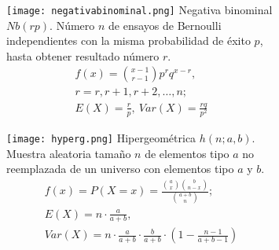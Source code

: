 \begin{figure}[H]
\begin{subfigure}[t]{.475\textwidth}\texttt{[image: negativabinominal.png]}
Negativa binominal $Nb(rp)$. Número $n$ de ensayos de Bernoulli independientes con la misma probabilidad de éxito $p$, hasta obtener resultado número $r$.
\begin{equation}\begin{matrix}
f(x)=\binom{x-1}{r-1}p^rq^{x-r},\\
r=r,r+1,r+2,\ldots,n;\\
E(X)=\frac{r}{p},\ Var(X)=\frac{rq}{p^2}
\end{matrix}\end{equation}\end{subfigure}\qquad
\begin{subfigure}[t]{.475\textwidth}\texttt{[image: hyperg.png]}
Hipergeométrica $h(n;a,b)$. Muestra aleatoria tamaño $n$ de elementos tipo $a$ no reemplazada de un universo con elementos tipo $a$ y $b$.
\begin{equation}\begin{matrix}
f(x)=P(X=x)=\frac{\binom{a}{x}\binom{b}{n-x}}{\binom{a+b}{n}};\\
E(X)=n\cdot\frac{a}{a+b},\\
Var(X)=n\cdot\frac{a}{a+b}\cdot\frac{b}{a+b}\cdot(1-\frac{n-1}{a+b-1})
\end{matrix}\end{equation}\end{subfigure}
\end{figure}



